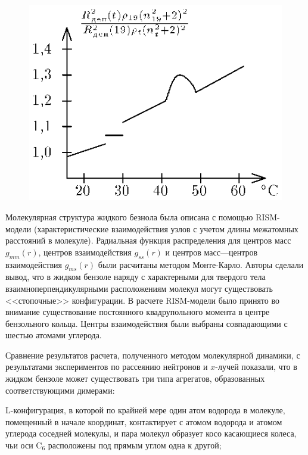 \begin{figure}[tbp]
\centerline{\hbox{\includegraphics[scale=1]{Ris/ris_eps/ris4_4_08_2.eps}}}

\end{figure}

Молекулярная структура жидкого безнола была описана с помощью RISM-модели (характеристические взаимодействия узлов с учетом длины межатомных расстояний в молекуле).
Радиальная функция распределения для центров масс $g_{mm}(r)$, центров взаимодействия $g_{ss}(r)$ и центров масс---центров взаимодействия $g_{ms}(r)$ были расчитаны методом Монте-Карло.
Авторы сделали вывод, что в жидком бензоле наряду с характерными для твердого тела взаимноперпендикулярными расположениям молекул могут существовать <<стопочные>> конфигурации.
В расчете RISM-модели было принято во внимание существование постоянного квадрупольного момента в центре бензольного кольца. Центры взаимодействия были выбраны совпадающими с шестью атомами углерода.

Сравнение результатов расчета, полученного методом молекулярной динамики, с результатами экспериментов по рассеянию нейтронов и $x$-лучей показали, что в жидком бензоле может существовать три типа агрегатов, образованных соответствующими димерами:

L-конфигурация, в которой по крайней мере один атом водорода в молекуле, помещенный в начале координат, контактирует
с атомом водорода и атомом углерода соседней молекулы, и пара молекул образует косо касающиеся колеса, чьи оси C$_6$ расположены под прямым углом одна к другой;

